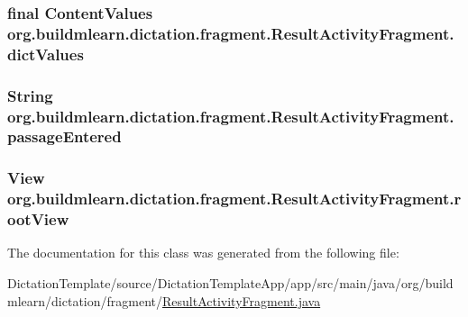 \subsubsection[{\texorpdfstring{dict\+Values}{dictValues}}]{\setlength{\rightskip}{0pt plus 5cm}final Content\+Values org.\+buildmlearn.\+dictation.\+fragment.\+Result\+Activity\+Fragment.\+dict\+Values\hspace{0.3cm}{\ttfamily [private]}}\hypertarget{classorg_1_1buildmlearn_1_1dictation_1_1fragment_1_1ResultActivityFragment_a6d00bb0c2da38bad38f59a7d40ea5546}{}\label{classorg_1_1buildmlearn_1_1dictation_1_1fragment_1_1ResultActivityFragment_a6d00bb0c2da38bad38f59a7d40ea5546}
\subsubsection[{\texorpdfstring{passage\+Entered}{passageEntered}}]{\setlength{\rightskip}{0pt plus 5cm}String org.\+buildmlearn.\+dictation.\+fragment.\+Result\+Activity\+Fragment.\+passage\+Entered\hspace{0.3cm}{\ttfamily [private]}}\hypertarget{classorg_1_1buildmlearn_1_1dictation_1_1fragment_1_1ResultActivityFragment_a899abafa90730100bd7e5b8f98442a27}{}\label{classorg_1_1buildmlearn_1_1dictation_1_1fragment_1_1ResultActivityFragment_a899abafa90730100bd7e5b8f98442a27}
\subsubsection[{\texorpdfstring{root\+View}{rootView}}]{\setlength{\rightskip}{0pt plus 5cm}View org.\+buildmlearn.\+dictation.\+fragment.\+Result\+Activity\+Fragment.\+root\+View\hspace{0.3cm}{\ttfamily [private]}}\hypertarget{classorg_1_1buildmlearn_1_1dictation_1_1fragment_1_1ResultActivityFragment_af65ba4a8c6a18b6421aa15a75de91c5e}{}\label{classorg_1_1buildmlearn_1_1dictation_1_1fragment_1_1ResultActivityFragment_af65ba4a8c6a18b6421aa15a75de91c5e}


The documentation for this class was generated from the following file\+:\begin{DoxyCompactItemize}
\item 
Dictation\+Template/source/\+Dictation\+Template\+App/app/src/main/java/org/buildmlearn/dictation/fragment/\hyperlink{ResultActivityFragment_8java}{Result\+Activity\+Fragment.\+java}\end{DoxyCompactItemize}
